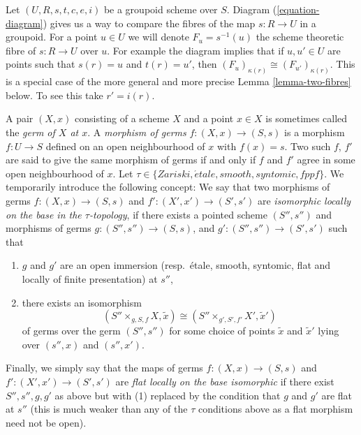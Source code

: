 \noindent
Let $(U, R, s, t, c, e, i)$ be a groupoid scheme over $S$.
Diagram (\ref{equation-diagram})
gives us a way to compare the fibres of the map $s : R \to U$ in a groupoid.
For a point $u \in U$ we will denote $F_u = s^{-1}(u)$ the scheme
theoretic fibre of $s : R \to U$ over $u$. For example the diagram
implies that if $u, u' \in U$ are points such
that $s(r) = u$ and $t(r) = u'$, then
$(F_u)_{\kappa(r)} \cong (F_{u'})_{\kappa(r)}$.
This is a special case of the more general and more precise
Lemma \ref{lemma-two-fibres}
below. To see this take $r' = i(r)$.

\medskip\noindent
A pair $(X, x)$ consisting of a scheme $X$ and a point $x \in X$ is sometimes
called the {\it germ of $X$ at $x$}.
A {\it morphism of germs} $f : (X, x) \to (S, s)$
is a morphism $f : U \to S$ defined on an open neighbourhood
of $x$ with $f(x) = s$. Two such
$f$, $f'$ are said to give the same morphism of germs
if and only if $f$ and $f'$ agree in some open neighbourhood of $x$.
Let $\tau \in \{Zariski, \acute{e}tale, smooth, syntomic, fppf\}$.
We temporarily introduce the following concept: We say that two morphisms
of germs $f : (X, x) \to (S, s)$ and $f' : (X', x') \to (S', s')$
are {\it isomorphic locally on the base in the $\tau$-topology},
if there exists a pointed scheme $(S'', s'')$ and morphisms of germs
$g : (S'', s'') \to (S, s)$, and $g' : (S'', s'') \to (S', s')$
such that
\begin{enumerate}
\item $g$ and $g'$ are an open immersion (resp.\ \'etale, smooth, syntomic,
flat and locally of finite presentation) at $s''$,
\item there exists an isomorphism
$$
(S'' \times_{g, S, f} X, \tilde x)
\cong
(S'' \times_{g', S', f'} X', \tilde  x')
$$
of germs over the germ $(S'', s'')$ for some choice of points
$\tilde x$ and $\tilde x'$ lying over $(s'', x)$ and $(s'', x')$.
\end{enumerate}
Finally, we simply say that the maps of germs
$f : (X, x) \to (S, s)$ and $f' : (X', x') \to (S', s')$
are {\it flat locally on the base isomorphic} if there exist
$S'', s'', g, g'$ as above but with (1) replaced by
the condition that $g$ and $g'$ are flat at $s''$ (this is
much weaker than any of the $\tau$ conditions above
as a flat morphism need not be open).

